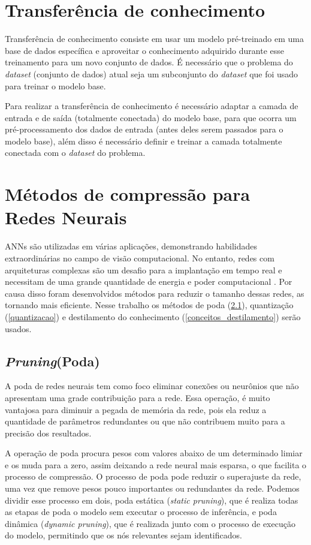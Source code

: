 \section{Transferência de conhecimento}\label{cap_conceitos_transferencia}
Transferência de conhecimento consiste em usar um modelo pré-treinado em uma base de dados específica e aproveitar
o conhecimento adquirido durante esse treinamento para um novo conjunto de dados.
É necessário que o problema do \textit{dataset} (conjunto de dados) atual seja um subconjunto do \textit{dataset}
que foi usado para treinar o modelo base.

Para realizar a transferência de conhecimento é necessário adaptar a camada de entrada e de saída
(totalmente conectada) do modelo base, para que ocorra um pré-processamento dos dados de entrada
(antes deles serem passados para o modelo base), além disso é necessário definir e treinar a camada totalmente
conectada com o \textit{dataset} do problema.

\section{Métodos de compressão para Redes Neurais}\label{cap_conceitos_compressao_redes}
ANNs são utilizadas em várias aplicações, demonstrando habilidades extraordinárias no campo de visão computacional.
No entanto, redes com arquiteturas complexas são um desafio para a implantação em tempo real e necessitam de uma
grande quantidade de energia e poder computacional \cite{LIANG2021370}.
Por causa disso foram desenvolvidos métodos para reduzir o tamanho dessas redes, as tornando mais eficiente.
Nesse trabalho os métodos de poda (\ref{poda}), quantização (\ref{quantizacao}) e destilamento do conhecimento
(\ref{conceitos_destilamento}) serão usados.

\subsection{\textit{Pruning}(Poda)}\label{poda}

A poda de redes neurais tem como foco eliminar conexões ou neurônios que não apresentam uma grade contribuição para a
rede.
Essa operação, é muito vantajosa para diminuir a pegada de memória da rede, pois ela reduz a quantidade de parâmetros
redundantes ou que não contribuem muito para a precisão dos resultados.


A operação de poda procura pesos com valores abaixo de um determinado limiar e os muda para a zero, assim deixando
a rede neural mais esparsa, o que facilita o processo de compressão.
O processo de poda pode reduzir o superajuste da rede, uma vez que remove pesos pouco importantes ou redundantes
da rede.
Podemos dividir esse processo em dois, poda estática (\textit{static pruning}), que é realiza todas as etapas de poda
o modelo sem executar o processo de inferência, e poda dinâmica (\textit{dynamic pruning}), que é realizada junto com
o processo de execução do modelo, permitindo que os nós relevantes sejam identificados.

